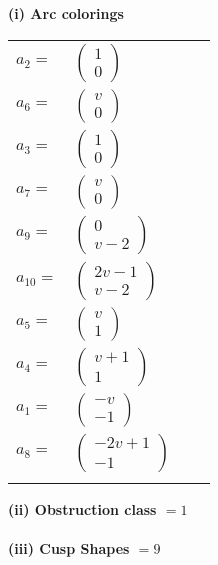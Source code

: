 \documentclass[1p]{elsarticle_modified}
\theoremstyle{definition}
\begin{document}
\flushleft \textbf{(i) Arc colorings}\\
\begin{tabular}{m{7pt} m{180pt} m{7pt} m{180pt} }
\flushright $a_{2}=$&$\begin{pmatrix}1\\0\end{pmatrix}$ \\
\flushright $a_{6}=$&$\begin{pmatrix}v\\0\end{pmatrix}$ \\
\flushright $a_{3}=$&$\begin{pmatrix}1\\0\end{pmatrix}$ \\
\flushright $a_{7}=$&$\begin{pmatrix}v\\0\end{pmatrix}$ \\
\flushright $a_{9}=$&$\begin{pmatrix}0\\v-2\end{pmatrix}$ \\
\flushright $a_{10}=$&$\begin{pmatrix}2 v-1\\v-2\end{pmatrix}$ \\
\flushright $a_{5}=$&$\begin{pmatrix}v\\1\end{pmatrix}$ \\
\flushright $a_{4}=$&$\begin{pmatrix}v+1\\1\end{pmatrix}$ \\
\flushright $a_{1}=$&$\begin{pmatrix}- v\\-1\end{pmatrix}$ \\
\flushright $a_{8}=$&$\begin{pmatrix}-2 v+1\\-1\end{pmatrix}$\\&\end{tabular}
\flushleft \textbf{(ii) Obstruction class $= 1$}\\~\\
\flushleft \textbf{(iii) Cusp Shapes $= 9$}\\~\\
\end{document}
